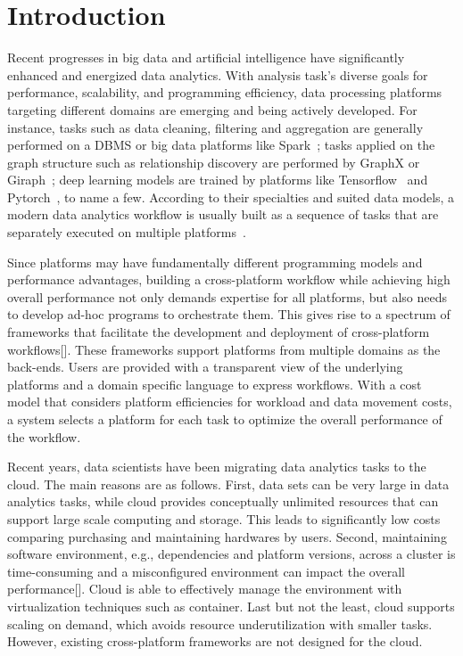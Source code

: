 \section{Introduction}

Recent progresses in big data and artificial intelligence have significantly enhanced and energized data analytics.  
With analysis task's diverse goals for performance, scalability, and programming efficiency, data processing platforms targeting different domains are emerging and being actively developed. 
For instance, tasks such as data cleaning, filtering and aggregation are generally performed on a DBMS or big data platforms like Spark~\cite{}; 
tasks applied on the graph structure such as relationship discovery are performed by GraphX or Giraph~\cite{}; 
deep learning models are trained by platforms like Tensorflow~\cite{} and Pytorch~\cite{}, to name a few.
According to their specialties and suited data models, a modern data analytics workflow is usually built as a sequence of tasks that are separately executed on multiple platforms~\cite{}. 

Since platforms may have fundamentally different programming
models and performance advantages, building a cross-platform workflow while achieving 
high overall performance not only demands expertise for all platforms, but also needs to develop ad-hoc programs to orchestrate them. 
This gives rise to a spectrum of frameworks that facilitate the development and deployment of cross-platform workflows[]. 
These frameworks support platforms from multiple domains as the back-ends. Users are provided with a transparent view of the underlying platforms and a domain specific language to express workflows. 
With a cost model that considers platform efficiencies for workload and data movement costs, a system selects a platform for each task to optimize the overall performance of the workflow.

Recent years, data scientists have been migrating data analytics tasks to the cloud. The main reasons are as follows. 
First, data sets can be very large in data analytics tasks, while cloud provides conceptually unlimited resources that can support large scale computing and storage. 
This leads to significantly low costs comparing purchasing and maintaining hardwares by users. 
Second, maintaining software environment, e.g., dependencies and platform versions, across a cluster is time-consuming and a misconfigured environment can impact the overall performance[]. 
Cloud is able to effectively manage the environment with virtualization techniques such as container. 
Last but not the least, cloud supports scaling on demand, which avoids resource underutilization with smaller tasks. 
However, existing cross-platform frameworks are not designed for the cloud.

